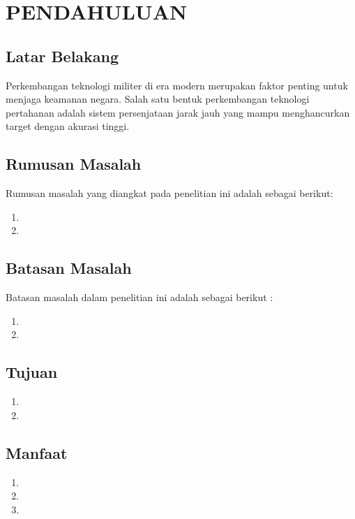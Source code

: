 \pagebreak
\chapter{PENDAHULUAN}
\section{Latar Belakang}
Perkembangan teknologi militer di era modern merupakan faktor penting untuk menjaga keamanan negara. Salah satu bentuk perkembangan teknologi pertahanan adalah sistem persenjataan jarak jauh yang mampu menghancurkan target dengan akurasi tinggi. 

\section{Rumusan Masalah}
Rumusan masalah yang diangkat pada penelitian ini adalah sebagai berikut:
\begin{enumerate} 
    \item 
    \item 
\end{enumerate}

\section{Batasan Masalah}
Batasan masalah dalam penelitian ini adalah sebagai berikut :
\begin{enumerate}
    \item  
    \item 
\end{enumerate}
 
\section{Tujuan}
\begin{enumerate}
    \item 
    \item 
\end{enumerate}

\section{Manfaat}
\begin{enumerate}
 \item 
 \item  
 \item 
\end{enumerate}
